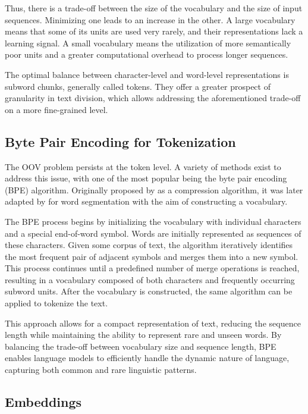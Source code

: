 Thus, there is a trade-off between the size of the vocabulary and the size of input sequences. Minimizing one leads to an increase in the other. A large vocabulary means that some of its units are used very rarely, and their representations lack a learning signal. A small vocabulary means the utilization of more semantically poor units and a greater computational overhead to process longer sequences.

The optimal balance between character-level and word-level representations is subword chunks, generally called tokens. They offer a greater prospect of granularity in text division, which allows addressing the aforementioned trade-off on a more fine-grained level.

\subsection{Byte Pair Encoding for Tokenization}

The OOV problem persists at the token level. A variety of methods exist to address this issue, with one of the most popular being the byte pair encoding (BPE) algorithm. Originally proposed by \citet{gage1994} as a compression algorithm, it was later adapted by \citet{sennrich2015} for word segmentation with the aim of constructing a vocabulary.

The BPE process begins by initializing the vocabulary with individual characters and a special end-of-word symbol. Words are initially represented as sequences of these characters. Given some corpus of text, the algorithm iteratively identifies the most frequent pair of adjacent symbols and merges them into a new symbol. This process continues until a predefined number of merge operations is reached, resulting in a vocabulary composed of both characters and frequently occurring subword units. After the vocabulary is constructed, the same algorithm can be applied to tokenize the text.

This approach allows for a compact representation of text, reducing the sequence length while maintaining the ability to represent rare and unseen words. By balancing the trade-off between vocabulary size and sequence length, BPE enables language models to efficiently handle the dynamic nature of language, capturing both common and rare linguistic patterns.

\subsection{Embeddings}\label{sec:embeddings}

